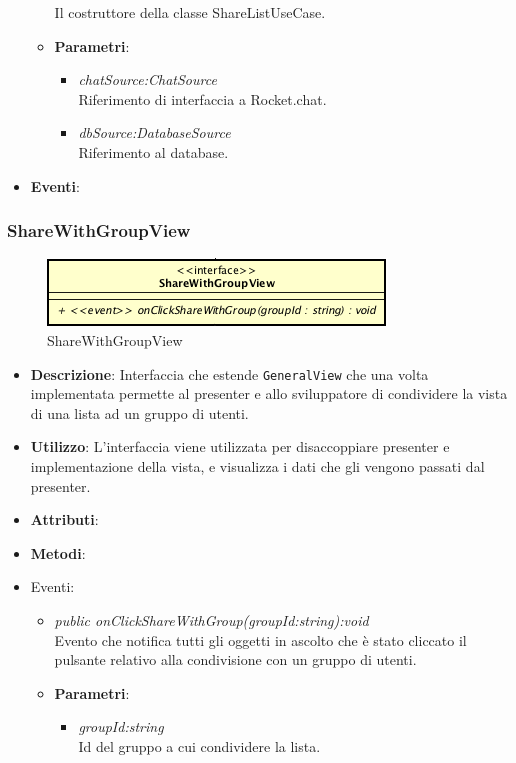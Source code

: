 \begin{itemize}
\begin{itemize}
	Il costruttore della classe ShareListUseCase.
	\item{\textbf{Parametri}: \begin{itemize}
	\item \textit{chatSource:ChatSource}\\
	 	Riferimento di interfaccia a Rocket.chat.
	\item \textit{dbSource:DatabaseSource}\\
		Riferimento al database.
	\end{itemize}}
\end{itemize}
\item \textbf{Eventi}:
\end{itemize}

\subsubsection{ShareWithGroupView}

\label{ShareWithGroupView}
\begin{figure}[ht]
	\centering
	\includegraphics[scale=0.5]{Sezioni/SottosezioniST/img/app/ShareWithGroupView.png}
	\caption{ShareWithGroupView}
\end{figure}

\begin{itemize}
\item \textbf{Descrizione}: Interfaccia che estende \texttt{GeneralView} che una volta implementata permette al presenter e allo sviluppatore di condividere la vista di una lista ad un gruppo di utenti.
\item \textbf{Utilizzo}: L'interfaccia viene utilizzata per disaccoppiare presenter e implementazione della vista, e visualizza i dati che gli vengono passati dal presenter.
\item \textbf{Attributi}: 
\item \textbf{Metodi}:
\item{Eventi}:
	\begin{itemize}
	\item \textit{public onClickShareWithGroup(groupId:string):void}\\
	Evento che notifica tutti gli oggetti in ascolto che è stato cliccato il pulsante relativo alla condivisione con un gruppo di utenti.										
	\item{\textbf{Parametri}: \begin{itemize}
			\item \textit{groupId:string}\\
			Id del gruppo a cui condividere la lista.
			\end{itemize}}
	\end{itemize}
\end{itemize}

